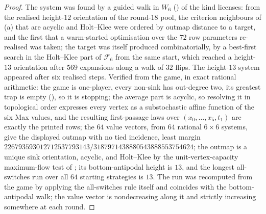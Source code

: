 \begin{proof}
The system was found by a guided walk in $W_6$ () of the
kind  licenses: from the realised height-$12$ orientation of
the round-$18$ pool, the criterion neighbours of (a) that are
acyclic and Holt--Klee were ordered by outmap distance to a target, and the
first that a warm-started optimisation over the $72$ row parameters
re-realised was taken; the target was itself produced combinatorially, by a
best-first search in the Holt--Klee part of $\mathcal F_6$ from the same
start, which reached a height-$13$ orientation after $569$ expansions along a
walk of $32$ flips. The height-$13$ system appeared after six realised steps.
Verified from the game, in exact rational arithmetic: the game is
one-player, every non-sink has out-degree two, its greatest trap is empty
(), so it is stopping; the average part is acyclic, so
resolving it in topological order expresses every vertex as a substochastic
affine function of the six Max values, and the resulting first-passage laws
over $(x_0,\dots,x_5,t_1)$ are exactly the printed rows; the $64$ value
vectors, from $64$ rational $6\times6$ systems, give the displayed outmap with
no tied incidence, least margin
$226793593012712537793143/3187971438880543888553754624$; the outmap is a
unique sink orientation, acyclic, and Holt--Klee by the
unit-vertex-capacity maximum-flow test of ; its
bottom-antipodal height is $13$, and the longest all-switches run over all
$64$ starting strategies is $13$. The run was recomputed from the game by
applying the all-switches rule itself and coincides with the bottom-antipodal
walk; the value vector is nondecreasing along it and strictly increasing
somewhere at each round.
\end{proof}

